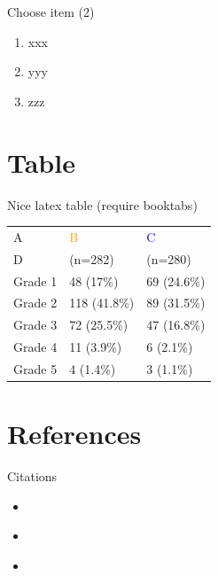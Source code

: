 \documentclass[table]{beamer}
\begin{document}
\begin{frame}[label={sec:orgfd37ec4}]{Choose item (2)}
\begin{enumerate}
\setcounter{enumi}{0}
\item xxx
\setcounter{enumi}{3}
\item yyy
\setcounter{enumi}{4}
\item zzz
\end{enumerate}
\end{frame}

\section{Table}
\label{sec:orgae34ab3}

\begin{frame}[label={sec:org0faae8e}]{Nice latex table}
(require booktabs)

\begin{table}
\begin{tabular}{lll}
\toprule
A  & \textcolor{orange}{B} & \textcolor{blue}{C} \\
D & (n=282)  & (n=280) \\
\midrule
Grade 1 & 48 (17\%)  & 69 (24.6\%) \\
Grade 2 & 118 (41.8\%)  & 89 (31.5\%) \\
Grade 3 & 72 (25.5\%)  & 47 (16.8\%) \\
Grade 4 & 11 (3.9\%) & 6 (2.1\%) \\
Grade 5 & 4 (1.4\%)  & 3 (1.1\%) \\
\bottomrule
\end{tabular}
\end{table}
\end{frame}

\section{References}
\label{sec:org1a5bfb8}

\begin{frame}[label={sec:org890b2af}]{Citations}
\begin{itemize}
\item \citep{pearson1905problem}
\item \cite{pearson1905problem}
\item \citep[xx]{pearson1905problem}
\end{itemize}
\cite[p.~150]{pearson1905problem}
\end{frame}
\end{document}

